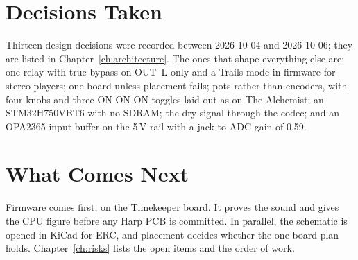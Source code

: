 \section{Decisions Taken}
Thirteen design decisions were recorded between 2026-10-04 and 2026-10-06; they are listed in Chapter~\ref{ch:architecture}. The ones that shape everything else are: one relay with true bypass on OUT~L only and a Trails mode in firmware for stereo players; one board unless placement fails; pots rather than encoders, with four knobs and three ON-ON-ON toggles laid out as on The Alchemist; an STM32H750VBT6 with no SDRAM; the dry signal through the codec; and an OPA2365 input buffer on the 5\,V rail with a jack-to-ADC gain of 0.59.

\section{What Comes Next}
Firmware comes first, on the Timekeeper board. It proves the sound and gives the CPU figure before any Harp PCB is committed. In parallel, the schematic is opened in KiCad for ERC, and placement decides whether the one-board plan holds. Chapter~\ref{ch:risks} lists the open items and the order of work.
